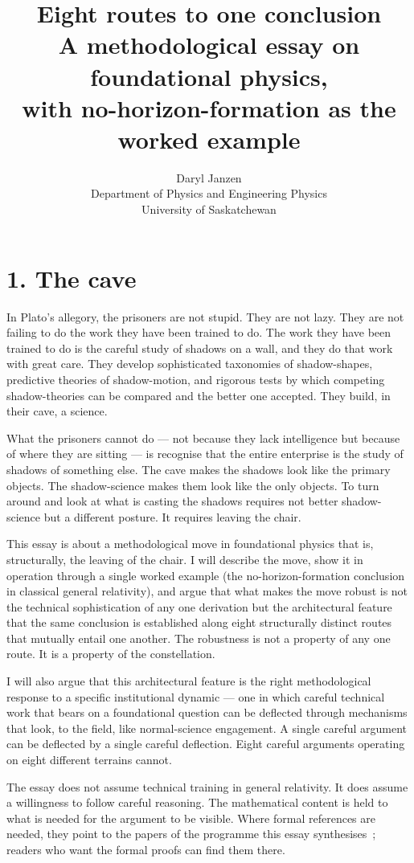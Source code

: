 \documentclass[11pt,a4paper]{article}
\title{\Large Eight routes to one conclusion\\[0.4em]
\large A methodological essay on foundational physics,\\
\large with no-horizon-formation as the worked example}
\author{Daryl Janzen\\
\small Department of Physics and Engineering Physics\\
\small University of Saskatchewan}
\date{}
\begin{document}
\maketitle

\section*{1. The cave}

In Plato's allegory, the prisoners are not stupid. They are not lazy. They are not failing to do the work they have been trained to do. The work they have been trained to do is the careful study of shadows on a wall, and they do that work with great care. They develop sophisticated taxonomies of shadow-shapes, predictive theories of shadow-motion, and rigorous tests by which competing shadow-theories can be compared and the better one accepted. They build, in their cave, a science.

What the prisoners cannot do --- not because they lack intelligence but because of where they are sitting --- is recognise that the entire enterprise is the study of shadows of something else. The cave makes the shadows look like the primary objects. The shadow-science makes them look like the only objects. To turn around and look at what is casting the shadows requires not better shadow-science but a different posture. It requires leaving the chair.

This essay is about a methodological move in foundational physics that is, structurally, the leaving of the chair. I will describe the move, show it in operation through a single worked example (the no-horizon-formation conclusion in classical general relativity), and argue that what makes the move robust is not the technical sophistication of any one derivation but the architectural feature that the same conclusion is established along eight structurally distinct routes that mutually entail one another. The robustness is not a property of any one route. It is a property of the constellation.

I will also argue that this architectural feature is the right methodological response to a specific institutional dynamic --- one in which careful technical work that bears on a foundational question can be deflected through mechanisms that look, to the field, like normal-science engagement. A single careful argument can be deflected by a single careful deflection. Eight careful arguments operating on eight different terrains cannot.

The essay does not assume technical training in general relativity. It does assume a willingness to follow careful reasoning. The mathematical content is held to what is needed for the argument to be visible. Where formal references are needed, they point to the papers of the programme this essay synthesises~\cite{JanzenBHcausality, JanzenCircle, JanzenSlicing, JanzenGroupoid, JanzenCRcosmology, JanzenFramework}; readers who want the formal proofs can find them there.
\end{document}
